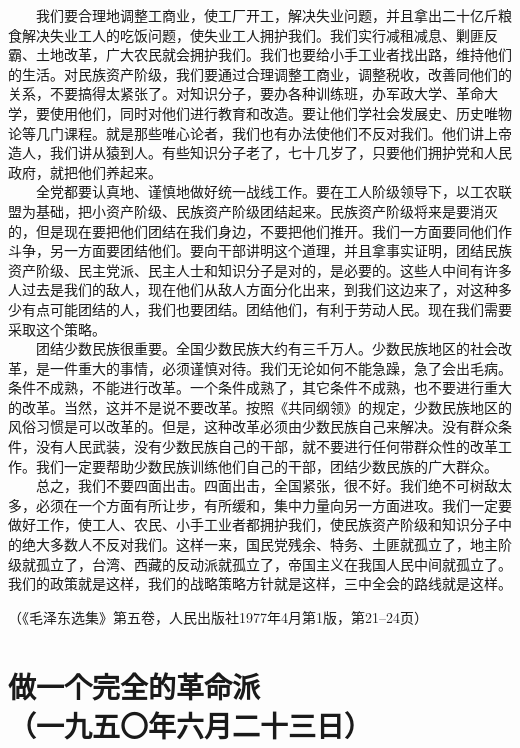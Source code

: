 \documentclass[cn,11pt,chinese]{elegantbook}
\def\myformat#1{\hfil\hfil #1}
\begin{document}
　　我们要合理地调整工商业，使工厂开工，解决失业问题，并且拿出二十亿斤粮食解决失业工人的吃饭问题，使失业工人拥护我们。我们实行减租减息、剿匪反霸、土地改革，广大农民就会拥护我们。我们也要给小手工业者找出路，维持他们的生活。对民族资产阶级，我们要通过合理调整工商业，调整税收，改善同他们的关系，不要搞得太紧张了。对知识分子，要办各种训练班，办军政大学、革命大学，要使用他们，同时对他们进行教育和改造。要让他们学社会发展史、历史唯物论等几门课程。就是那些唯心论者，我们也有办法使他们不反对我们。他们讲上帝造人，我们讲从猿到人。有些知识分子老了，七十几岁了，只要他们拥护党和人民政府，就把他们养起来。\\
　　全党都要认真地、谨慎地做好统一战线工作。要在工人阶级领导下，以工农联盟为基础，把小资产阶级、民族资产阶级团结起来。民族资产阶级将来是要消灭的，但是现在要把他们团结在我们身边，不要把他们推开。我们一方面要同他们作斗争，另一方面要团结他们。要向干部讲明这个道理，并且拿事实证明，团结民族资产阶级、民主党派、民主人士和知识分子是对的，是必要的。这些人中间有许多人过去是我们的敌人，现在他们从敌人方面分化出来，到我们这边来了，对这种多少有点可能团结的人，我们也要团结。团结他们，有利于劳动人民。现在我们需要采取这个策略。\\
　　团结少数民族很重要。全国少数民族大约有三千万人。少数民族地区的社会改革，是一件重大的事情，必须谨慎对待。我们无论如何不能急躁，急了会出毛病。条件不成熟，不能进行改革。一个条件成熟了，其它条件不成熟，也不要进行重大的改革。当然，这并不是说不要改革。按照《共同纲领》的规定，少数民族地区的风俗习惯是可以改革的。但是，这种改革必须由少数民族自己来解决。没有群众条件，没有人民武装，没有少数民族自己的干部，就不要进行任何带群众性的改革工作。我们一定要帮助少数民族训练他们自己的干部，团结少数民族的广大群众。\\
　　总之，我们不要四面出击。四面出击，全国紧张，很不好。我们绝不可树敌太多，必须在一个方面有所让步，有所缓和，集中力量向另一方面进攻。我们一定要做好工作，使工人、农民、小手工业者都拥护我们，使民族资产阶级和知识分子中的绝大多数人不反对我们。这样一来，国民党残余、特务、土匪就孤立了，地主阶级就孤立了，台湾、西藏的反动派就孤立了，帝国主义在我国人民中间就孤立了。我们的政策就是这样，我们的战略策略方针就是这样，三中全会的路线就是这样。\\
\begin{flushright}（《毛泽东选集》第五卷，人民出版社1977年4月第1版，第21--24页）\end{flushright}
\newpage\section*{\myformat{做一个完全的革命派}\\\myformat{（一九五〇年六月二十三日）}}
\end{document}

